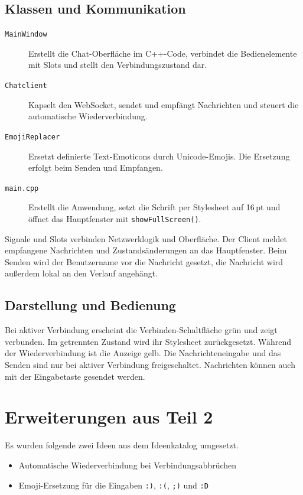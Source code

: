\subsection{Klassen und Kommunikation}
\begin{description}
  \item[\texttt{MainWindow}] Erstellt die Chat-Oberfläche im C++-Code,
    verbindet die Bedienelemente mit Slots und stellt den Verbindungszustand dar.
  \item[\texttt{Chatclient}] Kapselt den WebSocket, sendet und empfängt
    Nachrichten und steuert die automatische Wiederverbindung.
  \item[\texttt{EmojiReplacer}] Ersetzt definierte Text-Emoticons durch
    Unicode-Emojis. Die Ersetzung erfolgt beim Senden und Empfangen.
  \item[\texttt{main.cpp}] Erstellt die Anwendung, setzt die Schrift per
    Stylesheet auf 16\,pt und öffnet das Hauptfenster mit \texttt{showFullScreen()}.
\end{description}
Signale und Slots verbinden Netzwerklogik und Oberfläche. Der Client meldet
empfangene Nachrichten und Zustandsänderungen an das Hauptfenster.
Beim Senden wird der Benutzername vor die Nachricht gesetzt, die Nachricht
wird außerdem lokal an den Verlauf angehängt.

\subsection{Darstellung und Bedienung}
Bei aktiver Verbindung erscheint die Verbinden-Schaltfläche grün und zeigt
\glqq verbunden\grqq. Im getrennten Zustand wird ihr Stylesheet
zurückgesetzt. Während der Wiederverbindung ist die Anzeige gelb.
Die Nachrichteneingabe und das Senden sind nur bei aktiver Verbindung
freigeschaltet. Nachrichten können auch mit der Eingabetaste gesendet werden.

\newpage

\section{Erweiterungen aus Teil 2}
Es wurden folgende zwei Ideen aus dem Ideenkatalog umgesetzt. 

\begin{itemize}
  \item Automatische Wiederverbindung bei Verbindungsabbrüchen
  \item Emoji-Ersetzung für die Eingaben \texttt{:)}, \texttt{:(},
    \texttt{;)} und \texttt{:D}
\end{itemize}

